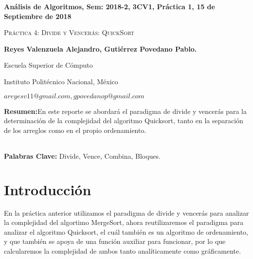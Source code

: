 \documentclass[12pt,twoside]{article}
\date{}
\begin{document}
\centerline{\bf An\'alisis de Algoritmos, Sem: 2018-2, 3CV1, Pr\'actica 1, 15 de Septiembre de 2018}
\centerline{}
\centerline{}
\begin{center}
\Large{\textsc{Pr\'actica 4:  Divide y Vencer\'as: QuickSort}}
\end{center}
\centerline{}
\centerline{\bf {Reyes Valenzuela Alejandro, Guti\'errez Povedano Pablo.}}
\centerline{}
\centerline{Escuela Superior de C\'omputo}
\centerline{Instituto Polit\'ecnico Nacional, M\'exico}
\centerline{$areyesv11@gmail.com, gpovedanop@gmail.com$}
\newtheorem{Theorem}{\quad Theorem}[section]
\newtheorem{Definition}[Theorem]{\quad Definition}
\newtheorem{Corollary}[Theorem]{\quad Corollary}
\newtheorem{Lemma}[Theorem]{\quad Lemma}
\newtheorem{Example}[Theorem]{\quad Example}
\bigskip
\textbf{Resumen:}En este reporte se abordar\'a el paradigma de divide y vencer\'as para la determinaci\'on de la complejidad del algoritmo Quicksort, tanto en la separaci\'on de los arreglos como en el propio ordenamiento.\\\\
\centerline{{\bf Palabras Clave:}  Divide, Vence, Combina, Bloques.}
\section{Introducci\'on}
En la pr\'actica anterior utilizamos el paradigma de divide y vencer\'as para analizar la complejidad del algortimo MergeSort, ahora reutilizaremos el paradigma para analizar el algoritmo Quicksort, el cu\'al tambi\'en es un algoritmo de ordenamiento, y que tambi\'en se apoya de una funci\'on auxiliar para funcionar, por lo que calcularemos la complejidad de ambos tanto anal\'iticamente como gr\'aficamente.\\\\
\end{document}

